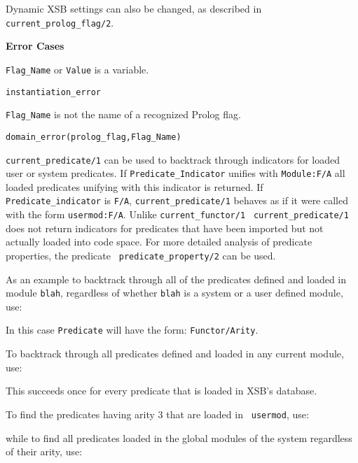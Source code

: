 \begin{description}
Dynamic XSB settings can also be changed, as described in {\tt
  current\_prolog\_flag/2}.

{\bf Error Cases}
\bi
\item 	{\tt Flag\_Name} or {\tt Value} is a variable.
\bi
\item 	{\tt instantiation\_error}
\ei
%
\item 	{\tt Flag\_Name} is not the name of a recognized Prolog flag.
\bi
\item 	{\tt domain\_error(prolog\_flag,Flag\_Name)}
\ei
\ei

%
{\tt current\_predicate/1} can be used to backtrack through indicators
for loaded user or system predicates.  If {\tt Predicate\_Indicator}
unifies with {\tt Module:F/A} all loaded predicates unifying with this
indicator is returned.  If {\tt Predicate\_indicator} is {\tt F/A},
{\tt current\_predicate/1} behaves as if it were called with the form
{\tt usermod:F/A}.  Unlike {\tt current\_functor/1} {\tt
current\_predicate/1} does not return indicators for predicates that
have been imported but not actually loaded into code space.  For more
detailed analysis of predicate properties, the predicate {\tt
predicate\_property/2} can be used.

As an example to backtrack through all of the predicates defined and loaded in
module {\tt blah}, regardless of whether {\tt blah} is a system or a
user defined module, use:


    In this case {\tt Predicate} will have the form: {\tt Functor/Arity}.

    To backtrack through all predicates defined and loaded in any current 
    module, use:


    This succeeds once for every predicate that is loaded in XSB's
    database.

    To find the predicates having arity 3 that are loaded in {\tt
    usermod}, use:


    while to find all predicates loaded in the global modules of the system
    regardless of their arity, use:

%


\end{description}

